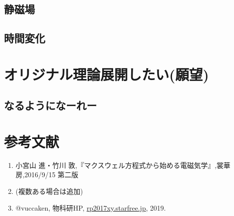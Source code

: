 \documentclass[10pt,b5paper,papersize,dvipdfmx]{jsbook}
\begin{document}
\subsection{静磁場}
\subsection{時間変化}
\subsection{}

\section{オリジナル理論展開したい(願望)}
\subsection{なるようになーれー}

\section{参考文献}
\renewcommand{\labelenumi}{[\arabic{enumi}]} %
\begin{enumerate}
\item 小宮山 進・竹川 敦,『マクスウェル方程式から始める電磁気学』,裳華房,2016/9/15 第二版
\item (複数ある場合は追加)
\item @vuccaken, 物科研HP, \url{rp2017xy.starfree.jp}, 2019.
\end{enumerate}
\renewcommand{\labelenumi}{\arabic{enumi}.} %
\end{document}
